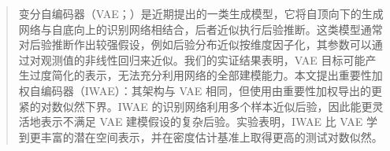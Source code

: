 \begin{abstract}
变分自编码器（VAE；\cite{vae}）是近期提出的一类生成模型，它将自顶向下的生成网络与自底向上的识别网络相结合，后者近似执行后验推断。这类模型通常对后验推断作出较强假设，例如后验分布近似按维度因子化，其参数可以通过对观测值的非线性回归来近似。我们的实证结果表明，VAE 目标可能产生过度简化的表示，无法充分利用网络的全部建模能力。本文提出重要性加权自编码器（IWAE）：其架构与 VAE 相同，但使用由重要性加权导出的更紧的对数似然下界。IWAE 的识别网络利用多个样本近似后验，因此能更灵活地表示不满足 VAE 建模假设的复杂后验。实验表明，IWAE 比 VAE 学到更丰富的潜在空间表示，并在密度估计基准上取得更高的测试对数似然。
\end{abstract}
